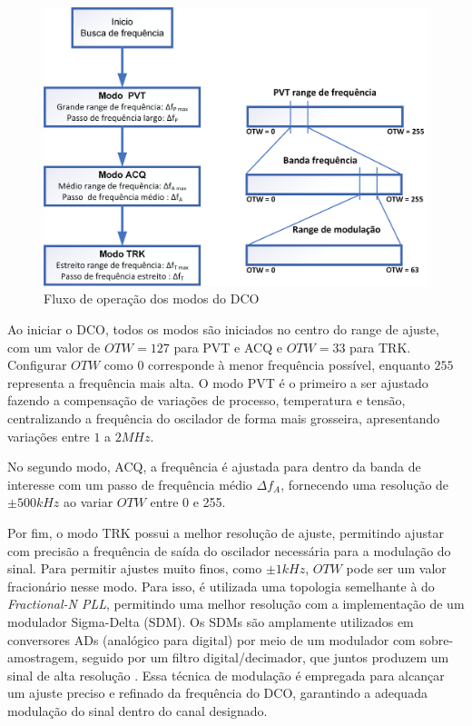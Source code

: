 \begin{figure}[htb]
	\caption{Fluxo de operação dos modos do DCO }
	\begin{center}
		\includegraphics[scale=0.6]{img/bank_modos.png}
	\end{center}
	\label{fig:bank_modos}
\end{figure}

Ao iniciar o DCO, todos os modos são iniciados no centro do range de ajuste, com um valor de $OTW=127$ para PVT e ACQ e $OTW=33$ para TRK. Configurar $OTW$ como $0$ corresponde à menor frequência possível, enquanto $255$ representa a frequência mais alta. O modo PVT é o primeiro a ser ajustado fazendo a compensação de variações de processo, temperatura e tensão, centralizando a frequência do oscilador de forma mais grosseira, apresentando variações entre $1$ a $2MHz$.

No segundo modo, ACQ, a frequência é ajustada para dentro da banda de interesse com um passo de frequência médio $\Delta f_A$, fornecendo uma resolução de $\pm 500kHz$ ao variar $OTW$ entre 0 e 255.

Por fim, o modo TRK possui a melhor resolução de ajuste, permitindo ajustar com precisão a frequência de saída do oscilador necessária para a modulação do sinal. Para permitir ajustes muito finos, como $\pm 1kHz$, $OTW$ pode ser um valor fracionário nesse modo. Para isso, é utilizada uma topologia semelhante à do \textit{Fractional-N PLL}, permitindo uma melhor resolução com a implementação de um modulador Sigma-Delta (SDM). Os SDMs são amplamente utilizados em conversores ADs (analógico para digital) por meio de um modulador com sobre-amostragem, seguido por um filtro digital/decimador, que juntos produzem um sinal de alta resolução \cite{sdmtexas}. Essa técnica de modulação é empregada para alcançar um ajuste preciso e refinado da frequência do DCO, garantindo a adequada modulação do sinal dentro do canal designado.



